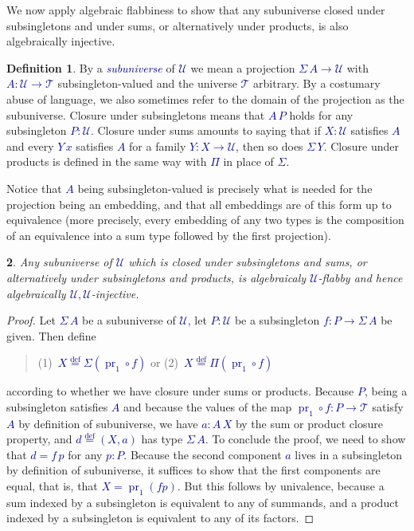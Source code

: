 \documentclass[10pt]{article}
\newcommand{\db}{\textcolor{darkblue}}
\newcommand{\df}[1]{\emph{\db{#1}}}
\newcommand{\m}[1]{\db{$#1$}}
\newcommand{\fst}{\operatorname{pr}_1}
\newcommand{\comp}{\mathrel{\circ}}
\newcommand{\U}{\mathcal{U}}
\newcommand{\T}{\mathcal{T}}
\newcommand{\eqdef}{\overset{\text{def}}{=}}
\newtheorem{numbered}{}
\theoremstyle{definition}
\newtheorem{definition}[numbered]{Definition}
\begin{document}
We now apply algebraic flabbiness to show that any subuniverse closed
under subsingletons and under sums, or alternatively under products,
is also algebraically injective.
\begin{definition}
  By a \df{subuniverse} of \m{\U} we mean a projection \m{\Sigma \, A
    \to \U} with \m{A : \U \to \T} subsingleton-valued and the
  universe \m{\T} arbitrary. By a costumary abuse of language, we also
  sometimes refer to the domain of the projection as the
  subuniverse. Closure under subsingletons means that \m{A\,P} holds
  for any subsingleton \m{P:\U}. Closure under sums amounts to
  saying that if \m{X:\U} satisfies \m{A} and every \m{Y \, x}
  satisfies \m{A} for a family \m{Y : X \to \U}, then so does
  \m{\Sigma \, Y}. Closure under products is defined in the same way
  with \m{\Pi} in place of \m{\Sigma}.
\end{definition}
\noindent Notice that \m{A} being subsingleton-valued is
precisely what is needed for the projection being an embedding, and
that all embeddings are of this form up to equivalence (more
precisely, every embedding of any two types is the composition of an
equivalence into a sum type followed by the first projection).

\begin{numbered}
  Any subuniverse of \m{\U} which is closed
  under subsingletons and sums, or alternatively under subsingletons and
  products, is algebraicaly \m{\U}-flabby and hence
  algebraically \m{\U,\U}-injective.
\end{numbered}
\begin{proof}
  Let \m{\Sigma\,A} be a subuniverse of \m{\U}, let \m{P:\U} be a
  subsingleton \m{f : P \to \Sigma \, A} be given. Then define
  \begin{quote}
  (1)~\m{ X \eqdef \Sigma (\fst \comp f)} \qquad or \qquad (2)~\m{X \eqdef \Pi (\fst \comp f)}
  \end{quote}
  according to whether we have closure under sums or products. Because
  \m{P}, being a subsingleton satisfies \m{A} and because the values
  of the map \m{\fst \comp f : P \to \T} satisfy \m{A} by definition
  of subuniverse, we have \m{a : A\, X} by the sum or product closure
  property, and \m{d \eqdef (X,a)} has type \m{\Sigma \,A}. To
  conclude the proof, we need to show that \m{d = f\,p} for any
  \m{p:P}. Because the second component \m{a} lives in a subsingleton
  by definition of subuniverse, it suffices to show that the first
  components are equal, that is, that \m{X = \fst (f p)}. But this
  follows by univalence, because a sum indexed by a subsingleton is
  equivalent to any of summands, and a product indexed by a
  subsingleton is equivalent to any of its factors.
\end{proof}
\end{document}
